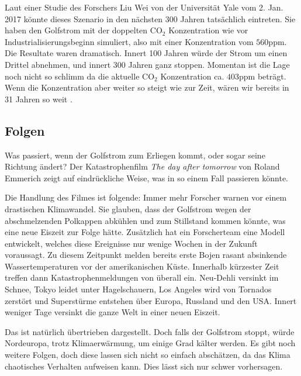 Laut einer Studie des Forschers Liu Wei von der Universität Yale vom 2. Jan. 2017 \cite{thermohalin:liuwei} könnte dieses Szenario in den nächsten 300 Jahren tatsächlich eintreten. Sie haben den Golfstrom mit der doppelten $\text{CO}_2$ Konzentration wie vor Industrialisierungsbeginn simuliert, also mit einer Konzentration vom $560\text{ppm}$. Die Resultate waren dramatisch. Innert 100 Jahren würde der Strom um einen Drittel abnehmen, und innert 300 Jahren ganz stoppen. Momentan ist die Lage noch nicht so schlimm da die aktuelle $\text{CO}_2$ Konzentration ca. $403\text{ppm}$ \cite{thermohalin:co2} beträgt. Wenn die Konzentration aber weiter so steigt wie zur Zeit, wären wir bereits in 31 Jahren so weit .

\subsection{Folgen}

Was passiert, wenn der Golfstrom zum Erliegen kommt, oder sogar seine Richtung ändert?
Der Katastrophenfilm {\em The day after tomorrow} von Roland Emmerich zeigt auf eindrückliche Weise, was in so einem Fall passieren könnte. 

Die Handlung des Filmes ist folgende: Immer mehr Forscher warnen vor einem drastischen Klimawandel. Sie glauben, dass der Golfstrom wegen der abschmelzenden Polkappen abkühlen und zum Stillstand kommen könnte, was eine neue Eiszeit zur Folge hätte. Zusätzlich hat ein Forscherteam eine Modell entwickelt, welches diese Ereignisse nur wenige Wochen in der Zukunft voraussagt. Zu diesem Zeitpunkt melden bereits erste Bojen rasant absinkende Wassertemperaturen vor der amerikanischen Küste. Innerhalb kürzester Zeit treffen dann Katastrophenmeldungen von überall ein. Neu-Dehli versinkt im Schnee, Tokyo leidet unter Hagelschauern, Los Angeles wird von Tornados zerstört und Superstürme entstehen über Europa, Russland und den USA. 
Innert weniger Tage versinkt die ganze Welt in einer neuen Eiszeit. 

Das ist natürlich übertrieben dargestellt. Doch falls der Golfstrom stoppt, würde Nordeuropa, trotz Klimaerwärmung, um einige Grad kälter werden. Es gibt noch weitere Folgen, doch diese lassen sich nicht so einfach abschätzen, da das Klima chaotisches Verhalten aufweisen kann. Dies lässt sich nur schwer vorhersagen.


